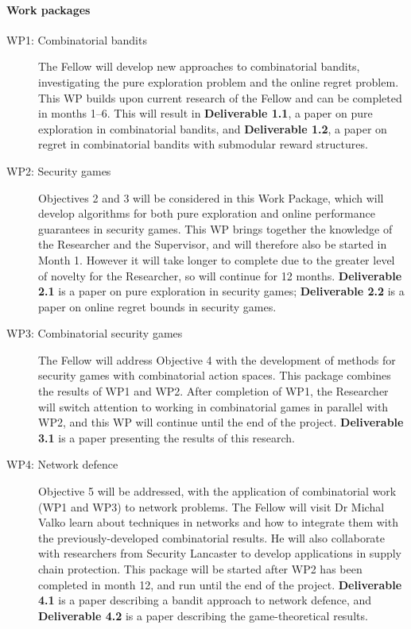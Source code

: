 \documentclass[a4paper,11pt]{article}
\begin{document}
\paragraph{Work packages}
\begin{description}
\item[WP1: Combinatorial bandits] The Fellow will develop new approaches to combinatorial bandits, investigating the pure exploration problem and the online regret problem.  This WP builds upon current research of the Fellow and can be completed in months 1--6.  This will result in {\bf Deliverable 1.1}, a paper on pure exploration in combinatorial bandits, and {\bf Deliverable 1.2}, a paper on regret in combinatorial bandits with submodular reward structures.
\item[WP2: Security games] Objectives 2 and 3 will be considered in this Work Package, which will develop algorithms for both pure exploration and online performance guarantees in security games.  This WP brings together the knowledge of the Researcher and the Supervisor, and will therefore also be started in Month 1.  However it will take longer to complete due to the greater level of novelty for the Researcher, so will continue for 12 months.  {\bf Deliverable 2.1} is a paper on pure exploration in security games; {\bf Deliverable 2.2} is a paper on online regret bounds in security games.
\item[WP3: Combinatorial security games] The Fellow will address Objective 4 with the development  of methods for security games with combinatorial action spaces. This package combines the results of WP1 and WP2.  After completion of WP1, the Researcher will switch attention to working in combinatorial games in parallel with WP2, and this WP will continue until the end of the project.  {\bf Deliverable 3.1} is a paper presenting the results of this research.
\item[WP4: Network defence] Objective 5 will be addressed, with the application of combinatorial work (WP1 and WP3) to network problems. The Fellow will visit Dr Michal Valko learn about techniques in networks and how to integrate them with the previously-developed combinatorial results.  He will also collaborate with researchers from Security Lancaster to develop applications in supply chain protection.  This package will be started after WP2 has been completed in month 12, and run until the end of the project. {\bf Deliverable 4.1} is a paper describing a bandit approach to network defence, and {\bf Deliverable 4.2} is a paper describing the game-theoretical results.
\end{description}
\end{document}
